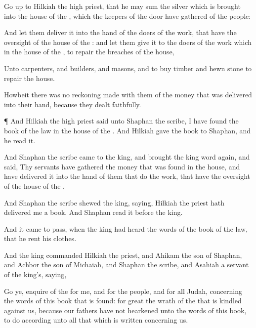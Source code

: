 {Go
up to
Hilkiah the
high
priest, that he may
sum the
silver which is
brought into the
house of the
{}, which the
keepers of the
door have
gathered of the
people:

And let them
deliver it into the
hand of the
doers of the
work, that have the
oversight of the
house of the
{}: and let them
give it to the
doers of the
work which
{} in the
house of the
{}, to
repair the
breaches of the
house,

Unto
carpenters, and
builders, and
masons, and to
buy
timber and
hewn
stone to
repair the
house.

Howbeit there was no reckoning
made with them of the
money that was
delivered into their
hand, because they
dealt
faithfully.


\par }{\PP {}¶ And
Hilkiah the
high
priest
said unto
Shaphan the
scribe, I have
found the
book of the
law in the
house of the
{}. And
Hilkiah
gave the
book to
Shaphan, and he
read it.

And
Shaphan the
scribe
came to the
king, and
brought the
king
word
again, and
said, Thy
servants have
gathered the
money that was
found in the
house, and have
delivered it into the
hand of them that
do the
work, that have the
oversight of the
house of the
{}.

And
Shaphan the
scribe
shewed the
king,
saying,
Hilkiah the
priest hath
delivered me a
book. And
Shaphan
read it
before the
king.


\par }{\PP {}And it came to pass, when the
king had
heard the
words of the
book of the
law, that he
rent his
clothes.

And the
king
commanded
Hilkiah the
priest, and
Ahikam the
son of
Shaphan, and
Achbor the
son of
Michaiah, and
Shaphan the
scribe, and
Asahiah a
servant of the
king’s,
saying,

Go ye,
enquire of the
{} for me, and for the
people, and for all
Judah, concerning the
words of this
book that is
found: for
great
{} the
wrath of the
{} that is
kindled against us, because our
fathers have not
hearkened unto the
words of this
book, to
do according unto all that which is
written concerning us.

}
